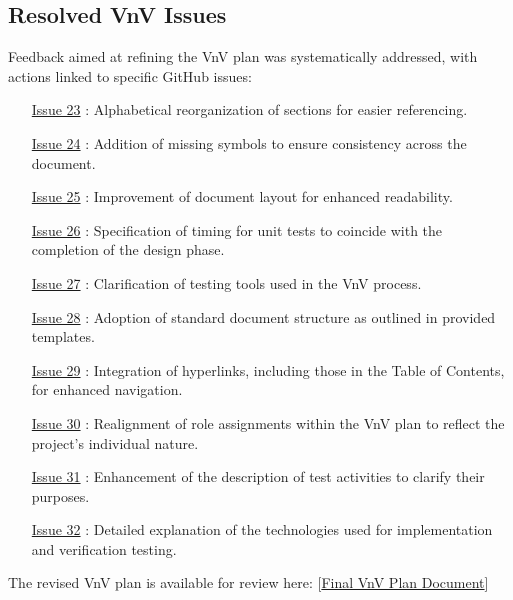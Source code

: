 \documentclass[12pt]{article}
\begin{document}
\subsection{Resolved VnV Issues}
Feedback aimed at refining the VnV plan was systematically addressed, with actions linked to specific GitHub issues:
\begin{itemize}
    \item [\href{https://github.com/XessX/Angry_Bird_Alike/issues/23}{Issue 23}]: Alphabetical reorganization of sections for easier referencing.
    \item [\href{https://github.com/XessX/Angry_Bird_Alike/issues/24}{Issue 24}]: Addition of missing symbols to ensure consistency across the document.
    \item [\href{https://github.com/XessX/Angry_Bird_Alike/issues/25}{Issue 25}]: Improvement of document layout for enhanced readability.
    \item [\href{https://github.com/XessX/Angry_Bird_Alike/issues/26}{Issue 26}]: Specification of timing for unit tests to coincide with the completion of the design phase.
    \item [\href{https://github.com/XessX/Angry_Bird_Alike/issues/27}{Issue 27}]: Clarification of testing tools used in the VnV process.
    \item [\href{https://github.com/XessX/Angry_Bird_Alike/issues/28}{Issue 28}]: Adoption of standard document structure as outlined in provided templates.
    \item [\href{https://github.com/XessX/Angry_Bird_Alike/issues/29}{Issue 29}]: Integration of hyperlinks, including those in the Table of Contents, for enhanced navigation.
    \item [\href{https://github.com/XessX/Angry_Bird_Alike/issues/30}{Issue 30}]: Realignment of role assignments within the VnV plan to reflect the project's individual nature.
    \item [\href{https://github.com/XessX/Angry_Bird_Alike/issues/31}{Issue 31}]: Enhancement of the description of test activities to clarify their purposes.
    \item [\href{https://github.com/XessX/Angry_Bird_Alike/issues/32}{Issue 32}]: Detailed explanation of the technologies used for implementation and verification testing.
\end{itemize}

The revised VnV plan is available for review here:
[\href{https://github.com/XessX/Angry_Bird_Alike/blob/main/docs/VnV/VnV.pdf}{Final VnV Plan Document}]
\end{document}
